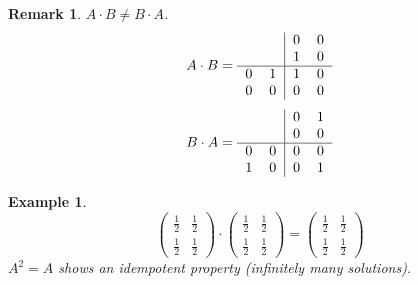 \documentclass[a4paper,landscape,twocolumn]{article}
\newtheorem{ex}{Example}[section]
\newtheorem{rem}{Remark}[section]
\begin{document}
\begin{rem}
  $A \cdot B \neq B \cdot A$.
  \[
    A\cdot B = \begin{tabular}{cc|cc}
       & & 0 & 0 \\
       & & 1 & 0 \\
      \hline
       0 & 1 & 1 & 0 \\
       0 & 0 & 0 & 0
    \end{tabular}
  \]
  \[
    B\cdot A = \begin{tabular}{cc|cc}
       & & 0 & 1 \\
       & & 0 & 0 \\
      \hline
       0 & 0 & 0 & 0 \\
       1 & 0 & 0 & 1
    \end{tabular}
  \]
\end{rem}
\begin{ex}
  \[
    \begin{pmatrix}
      \frac12 & \frac12 \\
      \frac12 & \frac12
    \end{pmatrix} \cdot
    \begin{pmatrix}
      \frac12 & \frac12 \\
      \frac12 & \frac12
    \end{pmatrix} =
    \begin{pmatrix}
      \frac12 & \frac12 \\
      \frac12 & \frac12
    \end{pmatrix}
  \]
  $A^2 = A$ shows an idempotent property (infinitely many solutions).
\end{ex}
\end{document}
